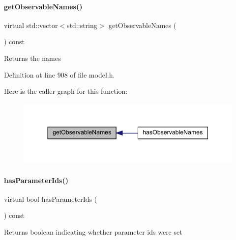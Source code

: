 \paragraph{\texorpdfstring{get\+Observable\+Names()}{getObservableNames()}}
{\footnotesize\ttfamily virtual std\+::vector$<$std\+::string$>$ get\+Observable\+Names (\begin{DoxyParamCaption}{ }\end{DoxyParamCaption}) const\hspace{0.3cm}{\ttfamily [virtual]}}

\begin{DoxyReturn}{Returns}
the names 
\end{DoxyReturn}


Definition at line 908 of file model.\+h.

Here is the caller graph for this function\+:
\nopagebreak
\begin{figure}[H]
\begin{center}
\leavevmode
\includegraphics[width=344pt]{classamici_1_1_model_a32b4a0c822a696e388aaa8284bf08059_icgraph}
\end{center}
\end{figure}
\mbox{\label{classamici_1_1_model_a216de46b6ca89c0bcc4f1c1418d2c06a}} 
\paragraph{\texorpdfstring{has\+Parameter\+Ids()}{hasParameterIds()}}
{\footnotesize\ttfamily virtual bool has\+Parameter\+Ids (\begin{DoxyParamCaption}{ }\end{DoxyParamCaption}) const\hspace{0.3cm}{\ttfamily [virtual]}}

\begin{DoxyReturn}{Returns}
boolean indicating whether parameter ids were set 
\end{DoxyReturn}


